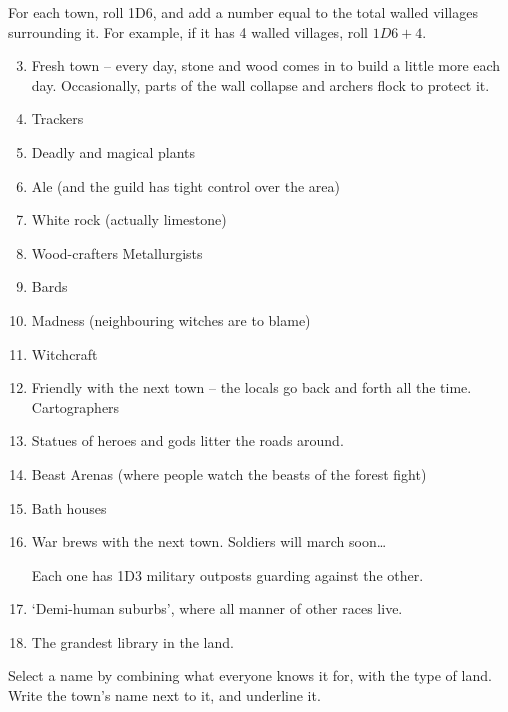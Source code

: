 \begin{multicols}{2}

For each town, roll 1D6, and add a number equal to the total walled villages surrounding it.
For example, if it has 4 walled villages, roll $1D6+4$.

\begin{multicols}{2}

\begin{enumerate}
\setcounter{enumi}{2}
  \item
  Fresh town -- every day, stone and wood comes in to build a little more each day.
  Occasionally, parts of the wall collapse and archers flock to protect it.
  \item
  Trackers
  \item
  Deadly and magical plants
  \item
  Ale (and the guild has tight control over the area)
  \item
  White rock (actually limestone)
  \item
  \ifodd\value{r4}
  Wood-crafters
  \else
  Metallurgists
  \fi
  \item
 Bards
  \item
  Madness (neighbouring witches are to blame)
  \item
  Witchcraft
  \item
  \ifodd\value{r4}
  Friendly with the next town -- the locals go back and forth all the
    time.
  \else
    Cartographers
  \fi
  \item
  Statues of heroes and gods litter the roads around.
  \item
  Beast Arenas (where people watch the beasts of the forest fight)
  \item
  Bath houses
  \item
  War brews with the next town.
  Soldiers will march soon\ldots

  Each one has 1D3 military outposts guarding against the other.
  \item
  `Demi-human suburbs', where all manner of other races live.
  \item
  The grandest library in the land.
\end{enumerate}

\end{multicols}


Select a name by combining what everyone knows it for, with the type of
land.
Write the town's name next to it, and underline it.


\end{multicols}
